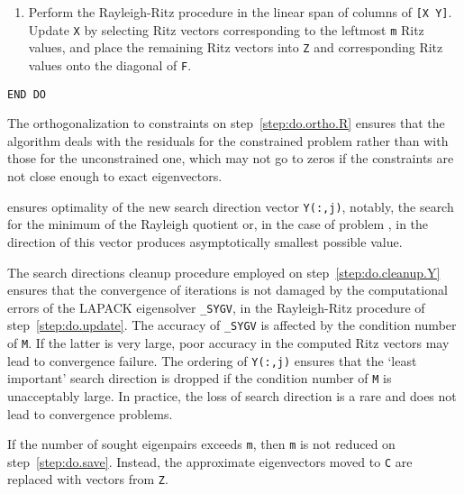 \begin{itemize}
\begin{enumerate}
{\tt B}-normalize the columns of {\tt Y} 
and reorder them
so that the {\tt B}-norm of the projection of
{\tt Y(:,j)} onto the linear span of
{\tt X} and {\tt Y(:,1:j-1)} is
an increasing function of {\tt j}.
Compute {\tt M = [X Y]'*B*[X Y]}.
If the condition number of {\tt M}
is greater than the allowed limit
of $10^4$
then start removing the last columns
of {\tt Y} and {\tt M} and respective
rows of {\tt M} until
the condition number falls below the limit.
%
\item
\label{step:do.update}
Perform the Rayleigh-Ritz procedure
in the linear span of columns of {\tt [X Y]}.
Update {\tt X} by selecting
Ritz vectors corresponding to the leftmost 
{\tt m} Ritz values,
and place the remaining Ritz vectors into {\tt Z}
and corresponding Ritz values onto the diagonal of {\tt F}.
%
\end{enumerate}

{\tt END DO}

\end{itemize}

The orthogonalization to constraints on step~\ref{step:do.ortho.R}
ensures that the algorithm deals with 
the residuals for the constrained problem
rather than with those for the unconstrained one,
which may not go to zeros
if the constraints are not close enough to exact eigenvectors.

 ensures  optimality of
the new search direction vector {\tt Y(:,j)},
notably, the search for the minimum
of the Rayleigh quotient  or,
in the case of problem , 
in the direction of this vector
produces asymptotically smallest possible value.

The search directions cleanup procedure
employed on step~\ref{step:do.cleanup.Y}
ensures that the convergence of iterations 
is not damaged by
the computational errors
of the LAPACK eigensolver {\tt \_SYGV},
in the Rayleigh-Ritz procedure of step~\ref{step:do.update}.
The accuracy of {\tt \_SYGV} is affected
by the condition number of {\tt M}.
If the latter is very large,
poor accuracy in the computed Ritz vectors may
lead to convergence failure.
The ordering of {\tt Y(:,j)} ensures
that the `least important' search direction
is dropped if the condition number of {\tt M}
is unacceptably large.
In practice, the loss of search direction is 
a rare 
and does not lead to convergence problems.

If the number of sought eigenpairs exceeds {\tt m}, then
{\tt m} is not reduced on step~\ref{step:do.save}.
Instead, the approximate eigenvectors
moved to {\tt C} are replaced with vectors from {\tt Z}.

